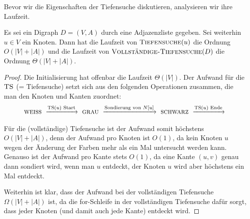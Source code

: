 \begin{bem}
	Bevor wir die Eigenschaften der Tiefensuche diskutieren, analysieren wir ihre Laufzeit.
\end{bem} 

\begin{thm}
\label{thm:laufzeit-tiefensuche}
Es sei ein Digraph $D=(V,A)$ durch eine Adjazenzliste gegeben. Sei weiterhin $u \in V$ ein Knoten. Dann hat die Laufzeit von $\mathop{\text{\textsc{Tiefensuche}}}(u)$ die Ordnung $O(|V|+|A|)$ und die Laufzeit von $\mathop{\text{\textsc{Vollständige-Tiefensuche}}}(D)$ die Ordnung $\Theta(|V|+|A|)$.
\end{thm}

\begin{proof}
Die Initialisierung hat offenbar die Laufzeit $\Theta(|V|)$.
Der Aufwand für die $\mathop{\text{\textsc{TS}}}$ (= Tiefensuche) setzt sich aus den folgenden Operationen zusammen, die man den Knoten und Kanten zuordnet: 
%
\begin{equation*}
	\cc{weiss} 
	\ \xrightarrow{\cc{TS}(u)\text{ Start}} \ 
	\cc{grau}
	\ \xrightarrow{\text{Sondierung von }N[u]}
	\ \cc{schwarz} 
	\  \xrightarrow{\cc{TS}(u)\text{ Ende}} \ 
\end{equation*} 

\noindent Für die (vollständige) Tiefensuche ist der Aufwand somit höchstens $O(|V|+|A|)$, denn der Aufwand pro Knoten ist $O(1)$, da kein Knoten $u$ wegen der Änderung der Farben mehr als ein Mal untersucht werden kann. Genauso ist der Aufwand pro Kante stets $O(1)$, da eine Kante $(u,v)$ genau dann sondiert wird, wenn man $u$ entdeckt, der Knoten $u$ wird aber höchstens ein Mal entdeckt.

Weiterhin ist klar, dass der Aufwand bei der vollständigen Tiefensuche $\Omega(|V|+|A|)$ ist, da die for-Schleife in der vollständigen Tiefensuche dafür sorgt, dass jeder Knoten (und damit auch jede Kante) entdeckt wird. 
\end{proof}



